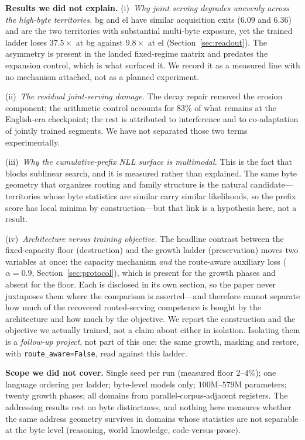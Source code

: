 \documentclass[11pt]{article}
\theoremstyle{definition}\newtheorem{definition}{Definition}
\theoremstyle{remark}\newtheorem{remark}{Remark}
\begin{document}
\textbf{Results we did not explain.} (i)~\emph{Why joint serving degrades unevenly
across the high-byte territories.} bg and el have similar acquisition exits ($6.09$ and
$6.36$) and are the two territories with substantial multi-byte exposure, yet the trained
ladder loses $37.5\times$ at bg against $9.8\times$ at el (Section~\ref{sec:readout}). The
asymmetry is present in the landed fixed-regime matrix and predates the expansion control,
which is what surfaced it. We record it as a measured line with no mechanism attached, not
as a planned experiment.

(ii)~\emph{The residual joint-serving damage.} The decay repair removed the erosion
component; the arithmetic control accounts for 83\% of what remains at the English-era
checkpoint; the rest is attributed to interference and to co-adaptation of jointly
trained segments. We have not separated those two terms experimentally.

(iii)~\emph{Why the cumulative-prefix NLL surface is multimodal.} This is the fact that
blocks sublinear search, and it is measured rather than explained. The same byte geometry
that organizes routing and family structure is the natural candidate---territories whose
byte statistics are similar carry similar likelihoods, so the prefix score has local
minima by construction---but that link is a hypothesis here, not a result.

(iv)~\emph{Architecture versus training objective.} The headline contrast between the
fixed-capacity floor (destruction) and the growth ladder (preservation) moves two
variables at once: the capacity mechanism \emph{and} the route-aware auxiliary loss
($\alpha=0.9$, Section~\ref{sec:protocol}), which is present for the growth phases and
absent for the floor. Each is disclosed in its own section, so the paper never juxtaposes
them where the comparison is asserted---and therefore cannot separate how much of the
recovered routed-serving competence is bought by the architecture and how much by the
objective. We report the construction and the objective we actually trained, not a claim
about either in isolation. Isolating them is a \emph{follow-up project}, not part of this
one: the same growth, masking and restore, with \texttt{route\_aware=False}, read against
this ladder.

\textbf{Scope we did not cover.} Single seed per run (measured floor 2--4\%); one
language ordering per ladder; byte-level models only; $100$M--$579$M parameters; twenty
growth phases; all domains from parallel-corpus-adjacent registers. The addressing results
rest on byte distinctness, and nothing here measures whether the same address geometry
survives in domains whose statistics are not separable at the byte level (reasoning, world
knowledge, code-versus-prose).
\end{document}
